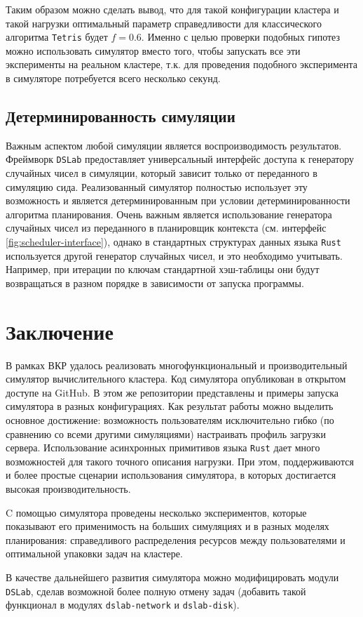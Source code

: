 Таким образом можно сделать вывод, что для такой конфигурации кластера и такой нагрузки оптимальный параметр справедливости для классического алгоритма \texttt{Tetris} будет $f = 0.6$. Именно с целью проверки подобных гипотез можно использовать симулятор вместо того, чтобы запускать все эти эксперименты на реальном кластере, т.к. для проведения подобного эксперимента в симуляторе потребуется всего несколько секунд. 

\subsection{Детерминированность симуляции}

Важным аспектом любой симуляции является воспроизводимость результатов. Фреймворк \texttt{DSLab} предоставляет универсальный интерфейс доступа к генератору случайных чисел в симуляции, который зависит только от переданного в симуляцию сида. Реализованный симулятор полностью использует эту возможность и является детерминированным при условии детерминированности алгоритма планирования. Очень важным является использование генератора случайных чисел из переданного в планировщик контекста (см. интерфейс \ref{fig:scheduler-interface}), однако в стандартных структурах данных языка \texttt{Rust} используется другой генератор случайных чисел, и это необходимо учитывать. Например, при итерации по ключам стандартной хэш-таблицы они будут возвращаться в разном порядке в зависимости от запуска программы. 

\section{Заключение}\label{sec:conclusion}

В рамках ВКР удалось реализовать многофункциональный и производительный симулятор вычислительного кластера. Код симулятора опубликован в открытом доступе на GitHub\cite{dslab-cluster-scheduling-repo}. В этом же репозитории представлены и примеры запуска симулятора в разных конфигурациях. Как результат работы можно выделить основное достижение: возможность пользователям исключительно гибко (по сравнению со всеми другими симуляциями) настраивать профиль загрузки сервера. Использование асинхронных примитивов языка \texttt{Rust} дает много возможностей для такого точного описания нагрузки. При этом, поддерживаются и более простые сценарии использования симулятора, в которых достигается высокая производительность.

C помощью симулятора проведены несколько экспериментов, которые показывают его применимость на больших симуляциях и в разных моделях планирования: справедливого распределения ресурсов между пользователями и  оптимальной упаковки задач на кластере. 


В качестве дальнейшего развития симулятора можно модифицировать модули \texttt{DSLab}, сделав возможной более полную отмену задач (добавить такой функционал в модулях \texttt{dslab-network} и \texttt{dslab-disk}). 


